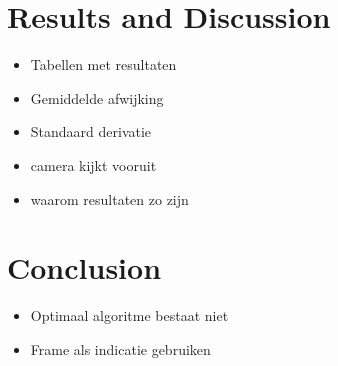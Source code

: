 \documentclass[a4paper]{article}
\begin{document}
\newpage 
\section{Results and Discussion}
\label{RESULTS_DISCUSSION}
\begin{itemize}
\item Tabellen met resultaten
\item Gemiddelde afwijking
\item Standaard derivatie
\end{itemize}
\begin{itemize}
\item camera kijkt vooruit
\item waarom resultaten zo zijn
\end{itemize}

\newpage
\section{Conclusion}
\label{CONCLUSION}
\begin{itemize}
\item Optimaal algoritme bestaat niet
\item Frame als indicatie gebruiken
\end{itemize}
\end{document}
